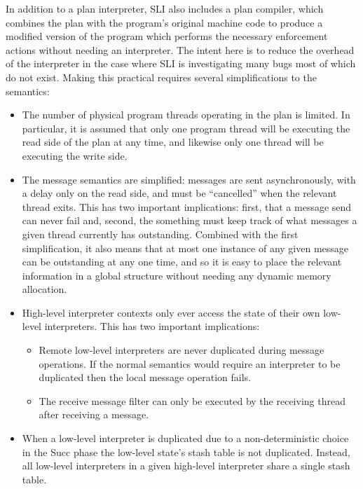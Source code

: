 In addition to a plan interpreter, SLI also includes a plan compiler, which combines the plan with the program's original machine code to produce a modified version of the program which performs the necessary enforcement actions without needing an interpreter.
The intent here is to reduce the overhead of the interpreter in the case where SLI is investigating many bugs most of which do not exist.
Making this practical requires several simplifications to the semantics:

\begin{itemize}
\item
  The number of physical program threads operating in the plan is limited.
  In particular, it is assumed that only one program thread will be executing the read side of the plan at any time, and likewise only one thread will be executing the write side.
\item
  The message semantics are simplified: messages are sent asynchronously, with a delay only on the read side, and must be ``cancelled'' when the relevant thread exits.
  This has two important implications: first, that a message send can never fail and, second, the something must keep track of what messages a given thread currently has outstanding.
  Combined with the first simplification, it also means that at most one instance of any given message can be outstanding at any one time, and so it is easy to place the relevant information in a global structure without needing any dynamic memory allocation.
\item
  High-level interpreter contexts only ever access the state of their own low-level interpreters.
  This has two important implications:

  \begin{itemize}
  \item
    Remote low-level interpreters are never duplicated during message operations.
    If the normal semantics would require an interpreter to be duplicated then the local message operation fails.
  \item
    The receive message filter can only be executed by the receiving thread after receiving a message.
  \end{itemize}
\item
  When a low-level interpreter is duplicated due to a non-deterministic choice in the Succ phase the low-level state's stash table is not duplicated.
  Instead, all low-level interpreters in a given high-level interpreter share a single stash table.
\end{itemize}

